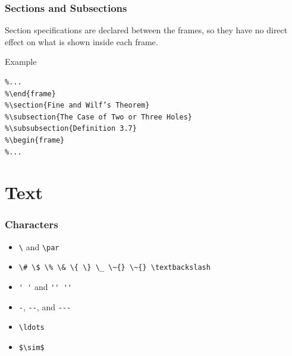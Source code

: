 \documentclass[aspectratio=169,utf8]{ctexbeamer}
\begin{document}
\begin{frame}[fragile]
  \frametitle{Sections and Subsections}

  Section specifications are declared between the frames, so they have no direct effect on what is shown inside each frame.

  \begin{block}{Example}

\begin{verbatim}
%...
%\end{frame}
%\section{Fine and Wilf’s Theorem}
%\subsection{The Case of Two or Three Holes}
%\subsubsection{Definition 3.7}
%\begin{frame}
%...
\end{verbatim}
    
  \end{block}
  

\end{frame}


\section{Text}

\begin{frame}[fragile]
  \frametitle{Characters}

  \begin{itemize}
    \setlength{\itemsep}{8pt}
    \item \texttt{\textbackslash} and \texttt{\textbackslash{}par}
    \item \verb|\# \$ \% \& \{ \} \_ \~{} \~{} \textbackslash|
    \item \verb|' '| and \verb|'' ''|
    \item \verb|-|, \verb|--|, and \verb|---|
    \item \verb|\ldots|
    \item \verb|$\sim$|
  \end{itemize}
\end{frame}
\end{document}
